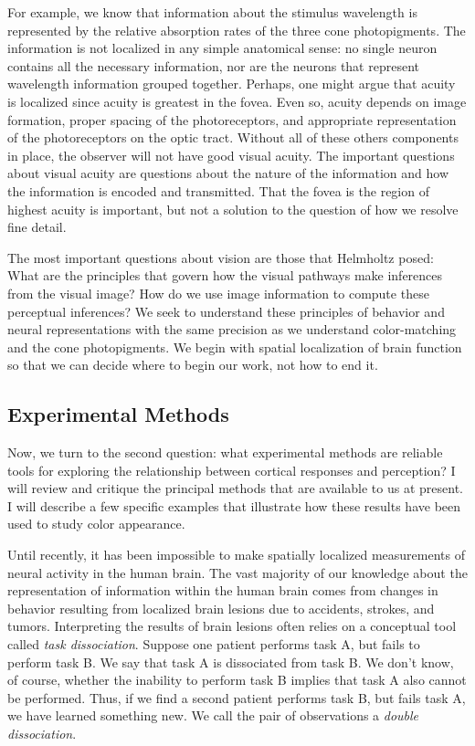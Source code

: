 For example, we know that information about the stimulus wavelength is
represented by the relative absorption rates of the three cone
photopigments.  The information is not localized in any simple
anatomical sense: no single neuron contains all the necessary
information, nor are the neurons that represent wavelength information
grouped together.  Perhaps, one might argue that acuity is localized
since acuity is greatest in the fovea.  Even so, acuity depends on
image formation, proper spacing of the photoreceptors, and appropriate
representation of the photoreceptors on the optic tract.  Without all
of these others components in place, the observer will not have good
visual acuity.  The important questions about visual acuity are
questions about the nature of the information and how the information
is encoded and transmitted.  That the fovea is the region of highest
acuity is important, but not a solution to the question of how we
resolve fine detail.

The most important questions about vision are those that Helmholtz
posed: What are the principles that govern how the visual pathways
make inferences from the visual image?  How do we use image
information to compute these perceptual inferences?  We seek to
understand these principles of behavior and neural representations
with the same precision as we understand color-matching and the cone
photopigments.  We begin with spatial localization of brain function
so that we can decide where to begin our work, not how to end it.

\subsection*{Experimental Methods}
Now, we turn to the second question: what experimental methods are
reliable tools for exploring the relationship between cortical
responses and perception?  I will review and critique the principal
methods that are available to us at present.  I will describe a few
specific examples that illustrate how these results have been used
to study color appearance.

Until recently, it has been impossible to make spatially localized
measurements of neural activity in the human brain.  The vast
majority of our knowledge about the representation of information
within the human brain comes from changes in behavior resulting from
localized brain lesions due to accidents, strokes, and tumors.
Interpreting the results of brain lesions often relies on a
conceptual tool called {\em task dissociation}.  Suppose one patient
performs task A, but fails to perform task B.  We say that task A is
dissociated from task B.  We don't know, of course, whether the
inability to perform task B implies that task A also cannot be
performed.  Thus, if we find a second patient performs task B, but
fails task A, we have learned something new.  We call the pair of
observations a {\em double dissociation}.


